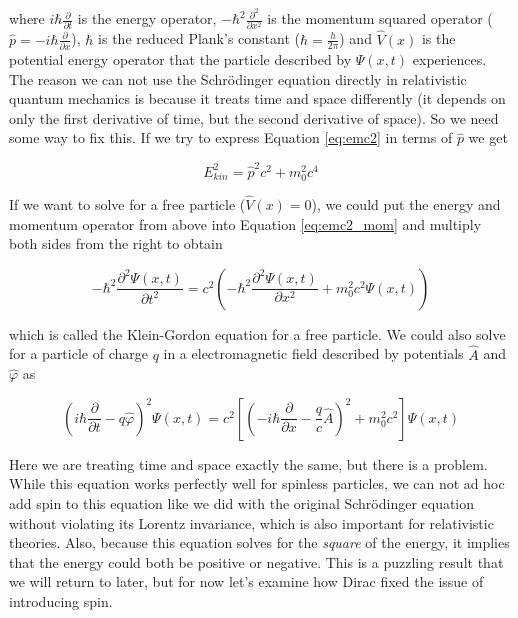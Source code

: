 where $i\hbar\frac{\partial}{\partial t}$ is the energy operator, $-\hbar^{2}\frac{\partial^{2}}{\partial x^{2}}$ is the momentum squared operator ($\hat{p} = -i\hbar\frac{\partial}{\partial x}$), $\hbar$ is the reduced Plank's constant ($\hbar = \frac{h}{2\pi}$) and $\hat{V}(x)$ is the potential energy operator that the particle described by $\Psi(x, t)$ experiences. The reason we can not use the Schr\"{o}dinger equation directly in relativistic quantum mechanics is because it treats time and space differently (it depends on only the first derivative of time, but the second derivative of space). So we need some way to fix this. If we try to express Equation \ref{eq:emc2} in terms of $\hat{p}$ we get\cite{Piela}

\begin{equation}
\label{eq:emc2_mom}
E_{kin}^{2} = \hat{p}^{2}c^{2} + m_{0}^{2}c^{4}
\end{equation}

If we want to solve for a free particle ($\hat{V}(x) = 0$), we could put the energy and momentum operator from above into Equation \ref{eq:emc2_mom} and multiply both sides from the right to obtain

\begin{equation}
\label{eq:klein-gord_free}
-\hbar^{2}\frac{\partial^{2}\Psi(x,t)}{\partial t^{2}} = c^{2}\left(-\hbar^{2}\frac{\partial^{2}\Psi(x, t)}{\partial x^{2}} + m_{0}^{2}c^{2}\Psi(x,t)\right)
\end{equation}

which is called the Klein-Gordon\cite{Gordon1926, Klein1927} equation for a free particle. We could also solve for a particle of charge $q$ in a electromagnetic field described by potentials $\hat{A}$ and $\hat{\varphi}$ as

\begin{equation}
\label{eq:klein-gord_elec_mag}
\left(i\hbar\frac{\partial}{\partial t} -q\hat{\varphi}\right)^{2}\Psi(x, t) = c^{2}\left[\left(-i\hbar\frac{\partial}{\partial x} - \frac{q}{c}\hat{A}\right)^{2} + m_{0}^{2}c^{2}\right]\Psi(x,t)
\end{equation}

Here we are treating time and space exactly the same, but there is a problem. While this equation works perfectly well for spinless particles, we can not ad hoc add spin to this equation like we did with the original Schr\"{o}dinger equation without violating its Lorentz invariance, which is also important for relativistic theories. Also, because this equation solves for the \textit{square} of the energy, it implies that the energy could both be positive or negative. This is a puzzling result that we will return to later, but for now let's examine how Dirac fixed the issue of introducing spin. 

